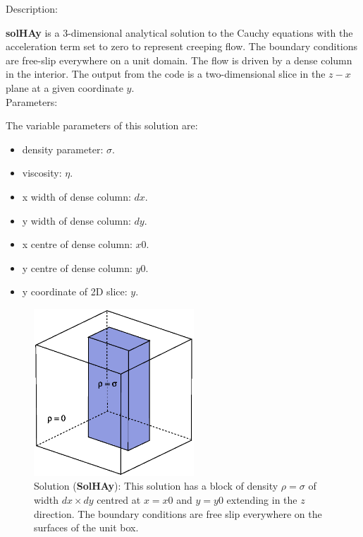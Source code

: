   {\large \fontB Description:}
  
  {\bf solHAy} is a 3-dimensional analytical solution to the Cauchy equations with the acceleration term set to zero
  to represent creeping flow. The boundary conditions are free-slip everywhere on a unit domain. 
  The flow is driven by a dense column in the interior. The output from the code is a two-dimensional slice
  in the $z - x$ plane at a given coordinate $y$.
  \\

  {\large \fontB Parameters:}
 
  The variable parameters of this solution are:
  \begin{itemize}
    \item{density parameter: $ \sigma $.}
    \item{viscosity: $\eta$.}
    \item{x width of dense column: $dx$.}
    \item{y width of dense column: $dy$.}
    \item{x centre of dense column: $x0$.}
    \item{y centre of dense column: $y0$.}
    \item{y coordinate of 2D slice: $y$.}
    \end{itemize}

  \begin{figure}
    \includegraphics[width=6cm,clip]{../figs/figHA.eps}
    \caption[Short caption]{\label{figHAy} 
      Solution ({\bf SolHAy}):
      This solution has a block of density $\rho = \sigma$
      of width $dx \times dy$ centred at $x=x0$ and $y=y0$    
       extending in the $z$ direction.
      The boundary conditions are free slip everywhere on the surfaces of the unit box.}
  \end{figure} 
  


